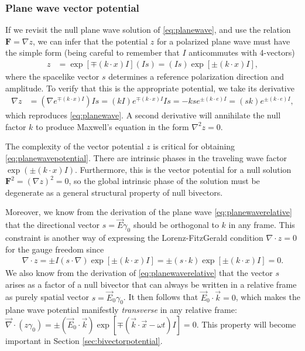 \documentclass[1p,sort&compress]{elsarticle}
\numberwithin{equation}{section}
\newcommand{\rv}[1]{\vec{#1}}
\newcommand{\bv}[1]{\mathbf{#1}}
\begin{document}
\subsubsection{Plane wave vector potential}\label{sec:planewavepotential}


If we revisit the null plane wave solution of \eqref{eq:planewave}, and use the relation $\bv{F} = \nabla z$, we can infer that the potential $z$ for a polarized plane wave must have the simple form (being careful to remember that $I$ anticommutes with 4-vectors)
\begin{align}\label{eq:planewavepotential}
  z &= \exp[\mp(k\cdot x)I](Is) = (Is)\exp[\pm(k\cdot x)I],
\end{align}
where the spacelike vector $s$ determines a reference polarization direction and amplitude.  To verify that this is the appropriate potential, we take its derivative 
\begin{align}
  \nabla z &= (\nabla e^{\mp(k\cdot x)I})Is = (kI)e^{\mp(k\cdot x)I}I s = -kse^{\pm(k\cdot e)I} = (sk)e^{\pm(k\cdot e)I},
\end{align}
which reproduces \eqref{eq:planewave}.  A second derivative will annihilate the null factor $k$ to produce Maxwell's equation in the form $\nabla^2 z = 0$.  

The complexity of the vector potential $z$ is critical for obtaining \eqref{eq:planewavepotential}.  There are intrinsic phases in the traveling wave factor $\exp(\pm(k\cdot x)I)$.  Furthermore, this is the vector potential for a null solution $\bv{F}^2 = (\nabla z)^2 = 0$, so the global intrinsic phase of the solution must be degenerate as a general structural property of null bivectors.

Moreover, we know from the derivation of the plane wave \eqref{eq:planewaverelative} that the directional vector $s = \rv{E}\gamma_0$ should be orthogonal to $k$ in any frame.  This constraint is another way of expressing the Lorenz-FitzGerald condition $\nabla \cdot z = 0$ for the gauge freedom since 
\begin{align}
  \nabla\cdot z = \pm I (s\cdot\nabla)\exp[\pm(k\cdot x) I] = \pm(s\cdot k)\exp[\pm(k\cdot x) I] = 0.
\end{align}
We also know from the derivation of \eqref{eq:planewaverelative} that the vector $s$ arises as a factor of a null bivector that can always be written in a relative frame as purely spatial vector $s = \rv{E}_0\gamma_0$.  It then follows that $\rv{E}_0\cdot\rv{k} = 0$, which makes the plane wave potential manifestly \emph{transverse} in any relative frame: $\rv{\nabla}\cdot(z\gamma_0) = \pm(\rv{E}_0\cdot\rv{k})\exp[\mp(\rv{k}\cdot\rv{x} - \omega t)I] = 0$.  This property will become important in Section \ref{sec:bivectorpotential}.
\end{document}
